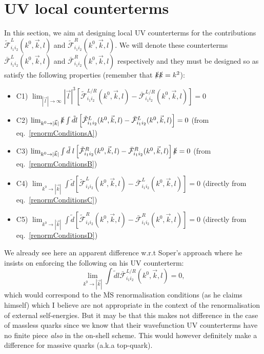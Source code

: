 \documentclass[11pt]{article}
\begin{document}
\section{UV local counterterms}

In this section, we aim at designing local UV counterterms for the contributions $\mathcal{\tilde{F}}^{L}_{i_1i_2}(k^0, \vec{k},l)$ and $\mathcal{\tilde{F}}^{R}_{i_1i_2}(k^0, \vec{k},l)$.
We will denote these counterterms $\mathcal{\bar{F}}^{L}_{i_1i_2}(k^0, \vec{k},l)$ and $\mathcal{\bar{F}}^{R}_{i_1i_2}(k^0, \vec{k},l)$ respectively and they must be designed so as satisfy the following properties (remember that $\slashed{k}\slashed{k}=k^2$):
\begin{itemize}
\item C1) $\lim_{|\vec{l}|\rightarrow \infty} |\vec{l}|^3 \left[ \mathcal{\tilde{F}}^{L/R}_{i_1i_2}(k^0, \vec{k},l) - \mathcal{\bar{F}}^{L/R}_{i_1i_2}(k^0, \vec{k},l) \right] =0$
\item C2) $\lim_{k^0\rightarrow |\vec{k}|} \slashed{k} \int \tilde{d}l \left[ \mathcal{\tilde{F}}^{L}_{i_1i_2}(k^0, \vec{k},l) - \mathcal{\bar{F}}^{L}_{i_1i_2}(k^0, \vec{k},l) \right] =0$ (from eq.~\ref{renormConditionsA})
\item C3) $\lim_{k^0\rightarrow |\vec{k}|} \int \tilde{d}\;l \left[ \mathcal{\tilde{F}}^{R}_{i_1i_2}(k^0, \vec{k},l) - \mathcal{\bar{F}}^{R}_{i_1i_2}(k^0, \vec{k},l) \right] \slashed{k} =0$ (from eq.~\ref{renormConditionsB})
\item C4) $\lim_{k^0\rightarrow |\vec{k}|} \int \tilde{d} \left[ \mathcal{\tilde{F}}^{L}_{i_1i_2}(k^0, \vec{k},l) - \mathcal{\bar{F}}^{L}_{i_1i_2}(k^0, \vec{k},l) \right] =0$ (directly from eq.~\ref{renormConditionsC})
\item C5) $\lim_{k^0\rightarrow |\vec{k}|} \int \tilde{d} \left[ \mathcal{\tilde{F}}^{R}_{i_1i_2}(k^0, \vec{k},l) - \mathcal{\bar{F}}^{R}_{i_1i_2}(k^0, \vec{k},l) \right] =0$ (directly from eq.~\ref{renormConditionsD})
\end{itemize}
We already see here an apparent difference w.r.t Soper's approach where he insists on enforcing the following on his UV counterterm:
\begin{equation}
\lim_{k^0\rightarrow |\vec{k}|} \int \tilde{d}l \mathcal{\bar{F}}^{L/R}_{i_1i_2}(k^0, \vec{k},l) = 0,
\end{equation}
which would correspond to the $\overline{\textrm{MS}}$ renormalisation conditions (as he claims himself) which I believe are not appropriate in the context of the renormalisation of external self-energies. But it may be that this makes not difference in the case of massless quarks since we know that their wavefunction UV counterterms have no finite piece \emph{also} in the on-shell scheme. This would however definitely make a difference for massive quarks (a.k.a top-quark).
\end{document}
